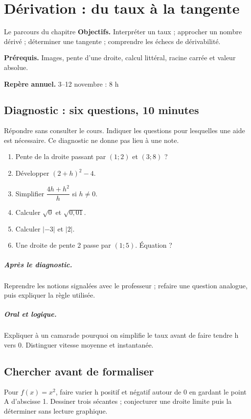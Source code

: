 \chapter{Dérivation : du taux à la tangente}\label{C04}
\begin{repere}{Le parcours du chapitre}
\textbf{Objectifs.} Interpréter un taux ; approcher un nombre dérivé ; déterminer une tangente ; comprendre les échecs de dérivabilité.

\textbf{Prérequis.} Images, pente d’une droite, calcul littéral, racine carrée et valeur absolue.

\textbf{Repère annuel.} 3–12 novembre : 8 h\end{repere}
\section*{Diagnostic : six questions, 10 minutes}\label{C04-D}
Répondre sans consulter le cours. Indiquer les questions pour lesquelles une aide est nécessaire. Ce diagnostic ne donne pas lieu à une note.
\begin{enumerate}
\item Pente de la droite passant par $(1;2)$ et $(3;8)$ ?
\item Développer $(2+h)^2-4$.
\item Simplifier $\dfrac{4h+h^2}{h}$ si $h\ne0$.
\item Calculer $\sqrt0$ et $\sqrt{0{,}01}$.
\item Calculer $|-3|$ et $|2|$.
\item Une droite de pente 2 passe par $(1;5)$. Équation ?
\end{enumerate}
\paragraph{Après le diagnostic.} Reprendre les notions signalées avec le professeur ; refaire une question analogue, puis expliquer la règle utilisée.
\paragraph{Oral et logique.} Expliquer à un camarade pourquoi on simplifie le taux avant de faire tendre h vers 0. Distinguer vitesse moyenne et instantanée.
\clearpage
\section*{Chercher avant de formaliser}\label{C04-RECH}
Pour $f(x)=x^2$, faire varier h positif et négatif autour de 0 en gardant le point A d’abscisse 1. Dessiner trois sécantes ; conjecturer une droite limite puis la déterminer sans lecture graphique.
